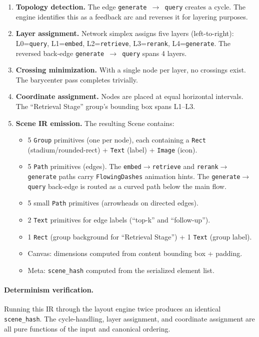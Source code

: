 \begin{enumerate}
  \item \textbf{Topology detection.} The edge \texttt{generate $\rightarrow$ query} creates a cycle. The engine identifies this as a feedback arc and reverses it for layering purposes.

  \item \textbf{Layer assignment.} Network simplex assigns five layers (left-to-right): L0=\texttt{query}, L1=\texttt{embed}, L2=\texttt{retrieve}, L3=\texttt{rerank}, L4=\texttt{generate}. The reversed back-edge \texttt{generate $\rightarrow$ query} spans 4 layers.

  \item \textbf{Crossing minimization.} With a single node per layer, no crossings exist. The barycenter pass completes trivially.

  \item \textbf{Coordinate assignment.} Nodes are placed at equal horizontal intervals. The ``Retrieval Stage'' group's bounding box spans L1--L3.

  \item \textbf{Scene IR emission.} The resulting Scene contains:
  \begin{itemize}
    \item 5 \texttt{Group} primitives (one per node), each containing a \texttt{Rect} (stadium/rounded-rect) + \texttt{Text} (label) + \texttt{Image} (icon).
    \item 5 \texttt{Path} primitives (edges). The \texttt{embed$\rightarrow$retrieve} and \texttt{rerank$\rightarrow$generate} paths carry \texttt{FlowingDashes} animation hints. The \texttt{generate$\rightarrow$query} back-edge is routed as a curved path below the main flow.
    \item 5 small \texttt{Path} primitives (arrowheads on directed edges).
    \item 2 \texttt{Text} primitives for edge labels (``top-k'' and ``follow-up'').
    \item 1 \texttt{Rect} (group background for ``Retrieval Stage'') + 1 \texttt{Text} (group label).
    \item Canvas: dimensions computed from content bounding box + padding.
    \item Meta: \texttt{scene\_hash} computed from the serialized element list.
  \end{itemize}
\end{enumerate}

\paragraph{Determinism verification.}
Running this IR through the layout engine twice produces an identical \texttt{scene\_hash}. The cycle-handling, layer assignment, and coordinate assignment are all pure functions of the input and canonical ordering.

